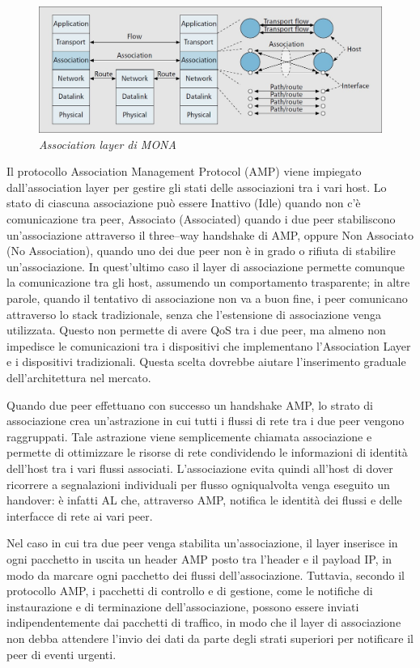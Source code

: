 \documentclass[12pt,a4paper,openright,twoside]{book}
\begin{document}
\begin{figure}
\centering
\includegraphics[width=\textwidth]{img/mona-association-layer}
\caption{\em Association layer di MONA}
\label{fig:mona-association-layer}
\end{figure}

Il protocollo Association Management Protocol (AMP) viene impiegato
dall'association layer per gestire gli stati delle associazioni tra i
vari host. Lo stato di ciascuna associazione può essere Inattivo
(Idle) quando non c'è comunicazione tra peer, Associato (Associated)
quando i due peer stabiliscono un'associazione attraverso il
three--way handshake di AMP, oppure Non Associato (No Association),
quando uno dei due peer non è in grado o rifiuta di stabilire
un'associazione. In quest'ultimo caso il layer di associazione
permette comunque la comunicazione tra gli host, assumendo un
comportamento trasparente; in altre parole, quando il tentativo di
associazione non va a buon fine, i peer comunicano attraverso lo stack
tradizionale, senza che l'estensione di associazione venga
utilizzata. Questo non permette di avere QoS tra i due peer, ma almeno
non impedisce le comunicazioni tra i dispositivi che implementano
l'Association Layer e i dispositivi tradizionali. Questa scelta
dovrebbe aiutare l'inserimento graduale dell'architettura nel mercato.

Quando due peer effettuano con successo un handshake AMP, lo strato di
associazione crea un'astrazione in cui tutti i flussi di rete tra i
due peer vengono raggruppati. Tale astrazione viene semplicemente
chiamata associazione e permette di ottimizzare le risorse di rete
condividendo le informazioni di identità dell'host tra i vari flussi
associati. L'associazione evita quindi all'host di dover ricorrere a
segnalazioni individuali per flusso ogniqualvolta venga eseguito un
handover: è infatti AL che, attraverso AMP, notifica le identità dei
flussi e delle interfacce di rete ai vari peer.

Nel caso in cui tra due peer venga stabilita un'associazione, il layer
inserisce in ogni pacchetto in uscita un header AMP posto tra l'header
e il payload IP, in modo da marcare ogni pacchetto dei flussi
dell'associazione. Tuttavia, secondo il protocollo AMP, i pacchetti di
controllo e di gestione, come le notifiche di instaurazione e di
terminazione dell'associazione, possono essere inviati
indipendentemente dai pacchetti di traffico, in modo che il layer di
associazione non debba attendere l'invio dei dati da parte degli
strati superiori per notificare il peer di eventi urgenti.
\end{document}
